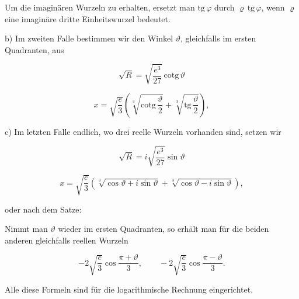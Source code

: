 
Um die imaginären Wurzeln zu erhalten, ersetzt man $\mathrm{tg}\,\varphi$ durch $\varrho\,\mathrm{tg}\,\varphi$, wenn $\varrho$ eine imaginäre dritte Einheitswurzel bedeutet.

b) Im zweiten Falle bestimmen wir den Winkel $\vartheta$, gleichfalls im ersten Quadranten, aus


\[
\sqrt{R} = \sqrt{\frac{e^3}{27}}\,\mathrm{cotg}\,\vartheta
\]

\[
x = \sqrt{\frac{e}{3}}\left(\sqrt[3]{\mathrm{cotg}\,\frac{\vartheta}{2}} + \sqrt[3]{\mathrm{tg}\,\frac{\vartheta}{2}}\right),
\]



c) Im letzten Falle endlich, wo drei reelle Wurzeln vorhanden sind, setzen wir


\[
\sqrt{R} = i\sqrt{\frac{e^3}{27}}\sin\vartheta
\]

\[
x = \sqrt{\frac{e}{3}}\left(\sqrt[3]{\cos\vartheta + i\sin\vartheta} + \sqrt[3]{\cos\vartheta - i\sin\vartheta}\right),
\]

oder nach dem  Satze:


Nimmt man $\vartheta$ wieder im ersten Quadranten, so erhält man für die beiden anderen gleichfalls reellen Wurzeln

\[
-2\sqrt{\frac{e}{3}}\cos\frac{\pi + \vartheta}{3}, \qquad -2\sqrt{\frac{e}{3}}\cos\frac{\pi - \vartheta}{3}.
\]

Alle diese Formeln sind für die logarithmische Rechnung eingerichtet.

